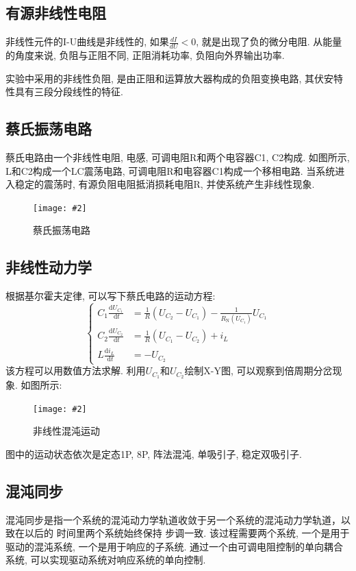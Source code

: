\documentclass[12pt,a4paper]{article}
\newcommand{\bfig}[3]{
    \begin{figure}[H]
        \centering
        \texttt{[image: \#2]}
        \caption{#3}
    \end{figure}
}
\begin{document}
\subsection{有源非线性电阻}
非线性元件的I-U曲线是非线性的, 如果$\frac{dI}{dU}<0$, 就是出现了负的微分电阻. 从能量的角度来说, 负阻与正阻不同, 正阻消耗功率, 负阻向外界输出功率.

实验中采用的非线性负阻, 是由正阻和运算放大器构成的负阻变换电路, 其伏安特性具有三段分段线性的特征. 
\subsection{蔡氏振荡电路}
蔡氏电路由一个非线性电阻, 电感, 可调电阻R和两个电容器C1, C2构成. 如图所示, L和C2构成一个LC震荡电路, 可调电阻R和电容器C1构成一个移相电路. 
当系统进入稳定的震荡时, 有源负阻电阻抵消损耗电阻R, 并使系统产生非线性现象. 

\bfig{0.5}{蔡氏电路.png}{蔡氏振荡电路}

\subsection{非线性动力学}
根据基尔霍夫定律, 可以写下蔡氏电路的运动方程:
\begin{equation}
\left \{ 
    \begin{aligned}
    C_{1} \frac{\mathrm{d} U_{C_{1}}}{\mathrm{~d} t} & =\frac{1}{R}\left(U_{C_{2}}-U_{C_{1}}\right)-\frac{1}{R_{\mathrm{N}}\left(U_{C_{1}}\right)} U_{C_{1}} \\
    C_{2} \frac{\mathrm{d} U_{C_{2}}}{\mathrm{~d} t} & =\frac{1}{R}\left(U_{C_{1}}-U_{C_{2}}\right)+i_{L} \\
    L \frac{\mathrm{d} i_{L}}{\mathrm{~d} t} & =-U_{C_{2}}
    \end{aligned} 
\right .
\end{equation}
该方程可以用数值方法求解. 利用$U_{C_1}$和$U_{C_2}$绘制X-Y图, 可以观察到倍周期分岔现象. 如图所示:
\bfig{0.8}{倍周期分叉示意图.png}{非线性混沌运动}

图中的运动状态依次是定态1P, 8P, 阵法混沌, 单吸引子, 稳定双吸引子. 
\subsection{混沌同步}
混沌同步是指一个系统的混沌动力学轨道收敛于另一个系统的混沌动力学轨道，以致在以后的
时间里两个系统始终保持
步调一致. 该过程需要两个系统, 一个是用于驱动的混沌系统, 一个是用于响应的子系统. 通过一个由可调电阻控制的单向耦合系统, 可以实现驱动系统对响应系统的单向控制. 
\end{document}
